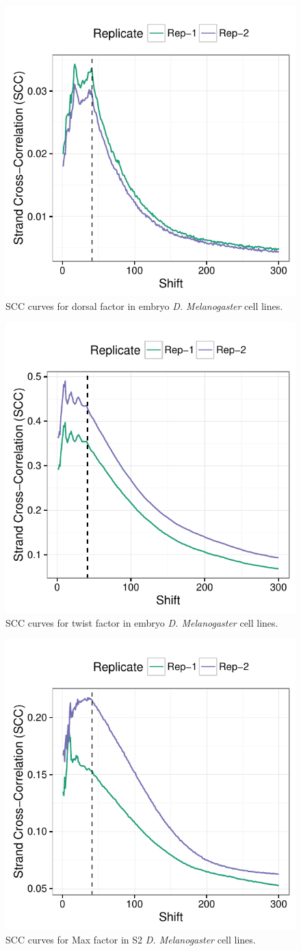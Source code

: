 \documentclass{article}
\begin{document}
\begin{figure}[H]
  \centering
  \includegraphics[width =        
  .5\textwidth]{figures/supplement/SCC/Nexus_embryo_dorsal_SCC.pdf}
  \caption{SCC curves for dorsal factor in embryo
    \emph{D. Melanogaster} cell lines.}
  \label{sfig:scc5}
\end{figure}

\begin{figure}[H]
  \centering
  \includegraphics[width =
  .5\textwidth]{figures/supplement/SCC/Nexus_embryo_twist_SCC.pdf}
  \caption{SCC curves for twist factor in embryo
    \emph{D. Melanogaster} cell lines.}
  \label{sfig:scc6}
\end{figure}

\begin{figure}[H]
  \centering
  \includegraphics[width =
  .5\textwidth]{figures/supplement/SCC/Nexus_S2_Max_SCC.pdf}
  \caption{SCC curves for Max factor in S2 \emph{D. Melanogaster} cell
    lines.}
  \label{sfig:scc7}
\end{figure}
\end{document}
